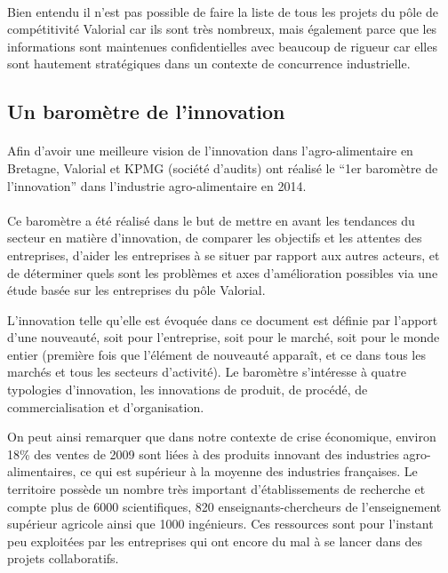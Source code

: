 \documentclass[a4paper,12pt]{report}
\begin{document}
				\paragraph{}Bien entendu il n’est pas possible de faire la liste de tous les projets du pôle de compétitivité Valorial car ils sont très nombreux, mais également parce que les informations sont maintenues confidentielles avec beaucoup de rigueur car elles sont hautement stratégiques dans un contexte de concurrence industrielle.

		\subsection{Un baromètre de l'innovation}
			
		    \paragraph{}Afin d’avoir une meilleure vision de l’innovation dans l’agro-alimentaire en Bretagne, Valorial et KPMG (société d’audits) ont réalisé le “1er baromètre de l’innovation” dans l’industrie agro-alimentaire en 2014. 

    	\paragraph{}Ce baromètre a été réalisé dans le but de mettre en avant les tendances du secteur en matière d’innovation, de comparer les objectifs et les attentes des entreprises, d’aider les entreprises à se situer par rapport aux autres acteurs, et de déterminer quels sont les problèmes et axes d’amélioration possibles via une étude basée sur les entreprises du pôle Valorial.

    L’innovation telle qu’elle est évoquée dans ce document est définie par l’apport d’une nouveauté, soit pour l’entreprise, soit pour le marché, soit pour le monde entier (première fois que l’élément de nouveauté apparaît, et ce dans tous les marchés et tous les secteurs d’activité). Le baromètre s’intéresse à quatre typologies d’innovation, les innovations de produit, de procédé, de commercialisation et d’organisation.

    On peut ainsi remarquer que dans notre contexte de crise économique, environ 18\% des ventes de 2009 sont liées à des produits innovant des industries agro-alimentaires, ce qui est supérieur à la moyenne des industries françaises. Le territoire possède un nombre très important d’établissements de recherche et compte plus de 6000 scientifiques, 820 enseignants-chercheurs de l’enseignement supérieur agricole ainsi que 1000 ingénieurs. Ces ressources sont pour l’instant peu exploitées par les entreprises qui ont encore du mal à se lancer dans des projets collaboratifs.
\end{document}

